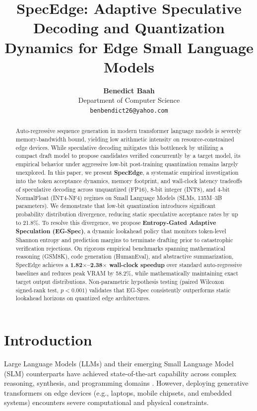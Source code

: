 \documentclass[10pt,twocolumn,letterpaper]{article}
\title{\textbf{SpecEdge: Adaptive Speculative Decoding and Quantization Dynamics for Edge Small Language Models}}
\author{
    \textbf{Benedict Baah}\\
    Department of Computer Science\\
    \texttt{benbendict26@yahoo.com}
}
\date{}
\begin{document}
\maketitle

\begin{abstract}
Auto-regressive sequence generation in modern transformer language models is severely memory-bandwidth bound, yielding low arithmetic intensity on resource-constrained edge devices. While speculative decoding mitigates this bottleneck by utilizing a compact draft model to propose candidates verified concurrently by a target model, its empirical behavior under aggressive low-bit post-training quantization remains largely unexplored. In this paper, we present \textbf{SpecEdge}, a systematic empirical investigation into the token acceptance dynamics, memory footprint, and wall-clock latency tradeoffs of speculative decoding across unquantized (FP16), 8-bit integer (INT8), and 4-bit NormalFloat (INT4-NF4) regimes on Small Language Models (SLMs, 135M--3B parameters). We demonstrate that low-bit quantization introduces significant probability distribution divergence, reducing static speculative acceptance rates by up to 21.8\%. To resolve this divergence, we propose \textbf{Entropy-Gated Adaptive Speculation (EG-Spec)}, a dynamic lookahead policy that monitors token-level Shannon entropy and prediction margins to terminate drafting prior to catastrophic verification rejections. On rigorous empirical benchmarks spanning mathematical reasoning (GSM8K), code generation (HumanEval), and abstractive summarization, SpecEdge achieves a \textbf{1.82$\times$--2.38$\times$ wall-clock speedup} over standard auto-regressive baselines and reduces peak VRAM by 58.2\%, while mathematically maintaining exact target output distributions. Non-parametric hypothesis testing (paired Wilcoxon signed-rank test, $p < 0.001$) validates that EG-Spec consistently outperforms static lookahead horizons on quantized edge architectures.
\end{abstract}

\section{Introduction}
Large Language Models (LLMs) and their emerging Small Language Model (SLM) counterparts have achieved state-of-the-art capability across complex reasoning, synthesis, and programming domains \cite{allal2024smollm, yang2024qwen25}. However, deploying generative transformers on edge devices (e.g., laptops, mobile chipsets, and embedded systems) encounters severe computational and physical constraints. 
\end{document}
